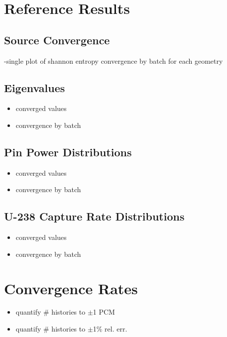 \section{Reference Results}

\subsection{Source Convergence}

-single plot of shannon entropy convergence by batch for each geometry

\subsection{Eigenvalues}

\begin{itemize}[noitemsep]
  \item converged values
  \item convergence by batch
\end{itemize}

\subsection{Pin Power Distributions}

\begin{itemize}[noitemsep]
  \item converged values
  \item convergence by batch
\end{itemize}

\subsection{U-238 Capture Rate Distributions}

\begin{itemize}[noitemsep]
  \item converged values
  \item convergence by batch
\end{itemize}


\section{Convergence Rates}

\begin{itemize}[noitemsep]
  \item quantify \# histories to $\pm$1 \ac{PCM}
  \item quantify \# histories to $\pm$1\% rel. err.
\end{itemize}